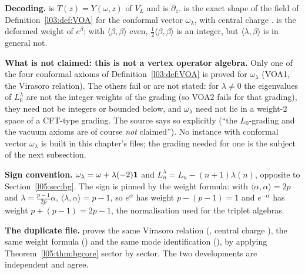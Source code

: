 \begin{dictionary}
\textbf{Decoding.}  is $T(z)=Y(\omega,z)$ of $V_L$ and  is $\partial_z$.
 is the exact shape of the field  of Definition~\ref{l03:def:VOA} for the
conformal vector $\omega_\lambda$, with central charge .  is the
deformed weight of $e^\beta$; with $\langle\beta,\beta\rangle$ even, $\frac12\langle\beta,\beta\rangle$ is an integer, but
$\langle\lambda,\beta\rangle$ is in general not.

\textbf{What is not claimed: this is not a vertex operator algebra.} Only one of the four conformal axioms of
Definition~\ref{l03:def:VOA} is proved for $\omega_\lambda$ (VOA1, the Virasoro relation). The others fail or are not
stated: for $\lambda\ne0$ the eigenvalues of $L^\lambda_0$ are not the integer weights of the grading
 (so VOA2 fails for that grading), they need not be integers or bounded below, and
$\omega_\lambda$ need not lie in a weight-$2$ space of a CFT-type grading. The source says so explicitly
(``the $L_0$-grading and the vacuum axioms are of course \emph{not} claimed''). No  instance
with conformal vector $\omega_\lambda$ is built in this chapter's files; the grading needed for one is the subject of
the next subsection.

\textbf{Sign convention.} $\omega_\lambda=\omega+\lambda(-2)\mathbf{1}$ and $L^\lambda_n=L_n-(n+1)\lambda(n)$, opposite to
Section~\ref{l05:sec:bg}. The sign is pinned by the weight formula: with $\langle\alpha,\alpha\rangle=2p$ and
$\lambda=\frac{p-1}{2p}\alpha$, $\langle\lambda,\alpha\rangle=p-1$, so $e^\alpha$ has weight $p-(p-1)=1$ and $e^{-\alpha}$ has
weight $p+(p-1)=2p-1$, the normalisation used for the triplet algebras.

\textbf{The duplicate file.}  proves the same Virasoro relation
(, central charge ), the same weight formula
() and the same mode identification (), by applying
Theorem~\ref{l05:thm:bgcore} sector by sector. The two developments are independent and agree.
\end{dictionary}

